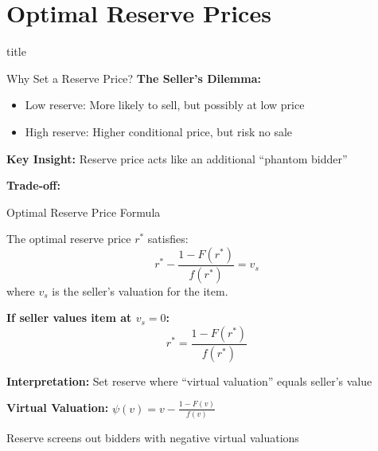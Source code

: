 \documentclass[xcolor={x11names}, aspectratio=169 ]{beamer}
\newcommand{\sectionslide}{%
  \begin{frame}
    \vfill
    \centering
    \begin{beamercolorbox}[sep=8pt,center,shadow=true,rounded=true]{title}
      \usebeamerfont{title}\insertsectionhead\par%
    \end{beamercolorbox}
    \vfill
  \end{frame}
}
\begin{document}
\section{Optimal Reserve Prices}
\sectionslide

\begin{frame}{Why Set a Reserve Price?}
\textbf{The Seller's Dilemma:}
\begin{itemize}
  \item Low reserve: More likely to sell, but possibly at low price
  \item High reserve: Higher conditional price, but risk no sale
\end{itemize}

\textbf{Key Insight:} Reserve price acts like an additional ``phantom bidder''

\textbf{Trade-off:}
\begin{center}
\end{center}
\end{frame}

\begin{frame}{Optimal Reserve Price Formula}
\begin{theorem}[Myerson 1981]
The optimal reserve price $r^*$ satisfies:
$$r^* - \frac{1-F(r^*)}{f(r^*)} = v_s$$
where $v_s$ is the seller's valuation for the item.
\end{theorem}

\textbf{If seller values item at $v_s = 0$:}
$$r^* = \frac{1-F(r^*)}{f(r^*)}$$

\textbf{Interpretation:} Set reserve where ``virtual valuation'' equals seller's value

\textbf{Virtual Valuation:} $\psi(v) = v - \frac{1-F(v)}{f(v)}$

Reserve screens out bidders with negative virtual valuations
\end{frame}
\end{document}
